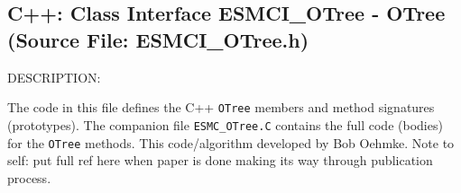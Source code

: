  
\setlength{\oldparskip}{\parskip}
\setlength{\parskip}{1.5ex}
\setlength{\oldparindent}{\parindent}
\setlength{\parindent}{0pt}
\setlength{\oldbaselineskip}{\baselineskip}
\setlength{\baselineskip}{11pt}
 
\def\bv{\begin{verbatim}}
\def\ev{\end{verbatim}}
\def\be{\begin{equation}}
\def\ee{\end{equation}}
\def\bea{\begin{eqnarray}}
\def\eea{\end{eqnarray}}
\def\bi{\begin{itemize}}
\def\ei{\end{itemize}}
\def\bn{\begin{enumerate}}
\def\en{\end{enumerate}}
\def\bd{\begin{description}}
\def\ed{\end{description}}
\def\({\left (}
\def\){\right )}
\def\[{\left [}
\def\]{\right ]}
\def\<{\left  \langle}
\def\>{\right \rangle}
\def\cI{{\cal I}}
\def\diag{\mathop{\rm diag}}
\def\tr{\mathop{\rm tr}}


 
\subsection{C++:  Class Interface ESMCI\_OTree - OTree (Source File: ESMCI\_OTree.h)}


  
{\sf DESCRIPTION:\\ }


  
   The code in this file defines the C++ {\tt OTree} members and method
   signatures (prototypes).  The companion file {\tt ESMC\_OTree.C}
   contains the full code (bodies) for the {\tt OTree} methods.
   This code/algorithm developed by Bob Oehmke. Note to self:
   put full ref here when paper is done making its way through 
   publication process. 
  
